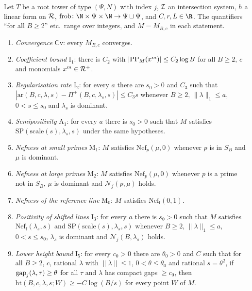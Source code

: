 \begin{definition}\label{pf:volthm:def:conditions}
Let $T$ be a root tower of type $(\Psi,N)$ with index $j$, $\mathcal{I}$ an intersection system, $h$ a linear form
on $\mathcal{R}$, $\mathrm{frob}\colon\N\times\Psi\times\N\to\Psi\sqcup\Psi$, and $C,r,L\in\R$. The
quantifiers ``for all $B\ge2$'' etc.\ range over integers, and $M=M_{B,c}$ in each statement.
\begin{enumerate}[label=(\arabic*)]
\item \emph{Convergence} $\mathrm{Cv}$: every $M_{B,c}$ converges.
\item \emph{Coefficient bound} $\mathrm{I}_1$: there is $C_2$ with $|\mathrm{PP}_M(x^m)|\le C_2\log B$ for all $B\ge2$, $c$ and monomials
  $x^m\in\mathcal{R}^+$.
\item \emph{Regularisation rate} $\mathrm{I}_2$: for every $a$ there are $s_0>0$ and $C_3$ such that
  $|\mathrm{ar}(B,c,\lambda,s)-\Pi^+(B,c,\lambda_s,s)|\le C_3s$ whenever $B\ge2$, $\|\lambda\|_1\le a$,
  $0<s\le s_0$ and $\lambda_s$ is dominant.
\item \emph{Semipositivity} $\mathrm{A}_1$: for every $a$ there is $s_0>0$ such that $M$ satisfies
  $\mathrm{SP}(\mathrm{scale}(s),\lambda_s,s)$ under the same hypotheses.
\item \emph{Nefness at small primes} $\mathrm{M}_1$: $M$ satisfies $\mathrm{Nef}_p(\mu,0)$ whenever $p$ is in $S_B$
  and $\mu$ is dominant.
\item \emph{Nefness at large primes} $\mathrm{M}_2$: $M$ satisfies $\mathrm{Nef}_p(\mu,0)$ whenever $p$ is a prime not in $S_B$, $\mu$ is
  dominant and $\mathcal N_j(p,\mu)$ holds.
\item \emph{Nefness of the reference line} $\mathrm{M}_0$: $M$ satisfies $\mathrm{Nef}_{\mathrm f}(0,1)$.
\item \emph{Positivity of shifted lines} $\mathrm{I}_3$: for every $a$ there is $s_0>0$ such that $M$ satisfies $\mathrm{Nef}_{\mathrm f}(\lambda_s,s)$ and
  $\mathrm{SP}(\mathrm{scale}(s),\lambda_s,s)$ whenever $B\ge2$, $\|\lambda\|_1\le a$, $0<s\le s_0$,
  $\lambda_s$ is dominant and $\mathcal N_j(B,\lambda_s)$ holds.
\item \emph{Lower height bound} $\mathrm{I}_5$: for every $c_0>0$ there are $\theta_0>0$ and $C$ such that for all $B\ge2$, $c$, rational
  $\lambda$ with $\|\lambda\|\le1$, $0<\theta\le\theta_0$ and rational $s=\theta^2$, if
  $\mathrm{gap}_j(\lambda,\tau)\ge\theta$ for all $\tau$ and $\lambda$ has compact gaps $\ge c_0$, then
  $\mathrm{ht}(B,c,\lambda,s;W)\ge-C\log(B/s)$ for every point $W$ of $M$.

\end{enumerate}
\end{definition}
